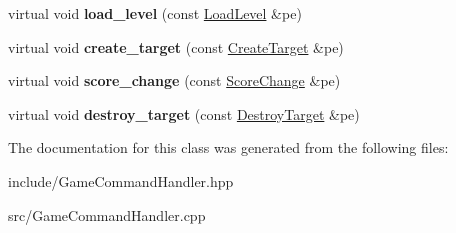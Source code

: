 \begin{DoxyCompactItemize}
\item 
\hypertarget{class_game_command_handler_aebbb840794d2ea7b975ff313e0ecbec0}{virtual void {\bfseries load\-\_\-level} (const \hyperlink{class_load_level}{Load\-Level} \&pe)}\label{class_game_command_handler_aebbb840794d2ea7b975ff313e0ecbec0}

\item 
\hypertarget{class_game_command_handler_a9bf349f0b73c3af95b5ab708279d9e3b}{virtual void {\bfseries create\-\_\-target} (const \hyperlink{class_create_target}{Create\-Target} \&pe)}\label{class_game_command_handler_a9bf349f0b73c3af95b5ab708279d9e3b}

\item 
\hypertarget{class_game_command_handler_a7a0199bbf10f1167f42670cb648759ee}{virtual void {\bfseries score\-\_\-change} (const \hyperlink{class_score_change}{Score\-Change} \&pe)}\label{class_game_command_handler_a7a0199bbf10f1167f42670cb648759ee}

\item 
\hypertarget{class_game_command_handler_a420309474238a2692e518b01b9b65fb6}{virtual void {\bfseries destroy\-\_\-target} (const \hyperlink{class_destroy_target}{Destroy\-Target} \&pe)}\label{class_game_command_handler_a420309474238a2692e518b01b9b65fb6}

\end{DoxyCompactItemize}


The documentation for this class was generated from the following files\-:\begin{DoxyCompactItemize}
\item 
include/Game\-Command\-Handler.\-hpp\item 
src/Game\-Command\-Handler.\-cpp\end{DoxyCompactItemize}
